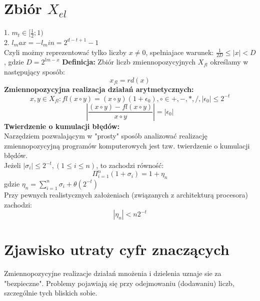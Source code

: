 \documentclass[12pt]{article}
\begin{document}
\section*{Zbiór $X_{el}$}
1. $m_t \in [\frac{1}{2};1)$\\
2. $l_max = - l_min = 2^{d-t+1} -1$\\
Czyli możmy reprezentować tylko liczby $x \neq 0$, spełniajace warunek: $\frac{1}{2D} \leq |x| < D$, gdzie $D = 2^{lm-x}$
\textbf{Definicja:} Zbiór liczb zmiennopozycyjnych $X_{fl}$ określamy w następujący sposób:
$$x_{fl} = rd(x)$$
\textbf{Zmiennopozycyjna realizacja działań arytmetycznych:}
$$ x,y \in X_{fl}: fl(x \circ y)= (x \circ y)(1+ \epsilon_0), \circ \in {+,-,*,/}, |\epsilon_0| \leq 2^{-t}$$
$$|\frac{(x\circ y)- fl(x \circ y)}{x \circ y}| = |\epsilon_0|$$
\textbf{Twierdzenie o kumulacji błędów:}\\
Narzędziem pozwalającym w "prosty" sposób analizować realizację zmiennopozycyjną programów komputerowych jest tzw. twierdzenie o kumulacji błędów.\\
\linebreak
Jeżeli $|\sigma_i| \leq 2^{-t}, (1 \leq i \leq n)$, to zachodzi równość:
$$\Pi^n_{i=1} (1+\sigma_i) = 1+ \eta_n$$
gdzie $\eta_n = \sum^n_{i=1} \sigma_i + \theta(2^{-t})$\\
Przy pewnych realistycznych założeniach (związanych z architekturą procesora) zachodzi:
$$| \eta_n| < n2^{-t}$$
\section*{Zjawisko utraty cyfr znaczących}
Zmiennopozycyjne realizacje działań mnożenia i dzielenia uznaje sie za "bezpieczne". Problemy pojawiają się przy odejmowaniu (dodawaniu) liczb, szczególnie tych bliskich sobie.
\setcounter{page}{2}
\end{document}
